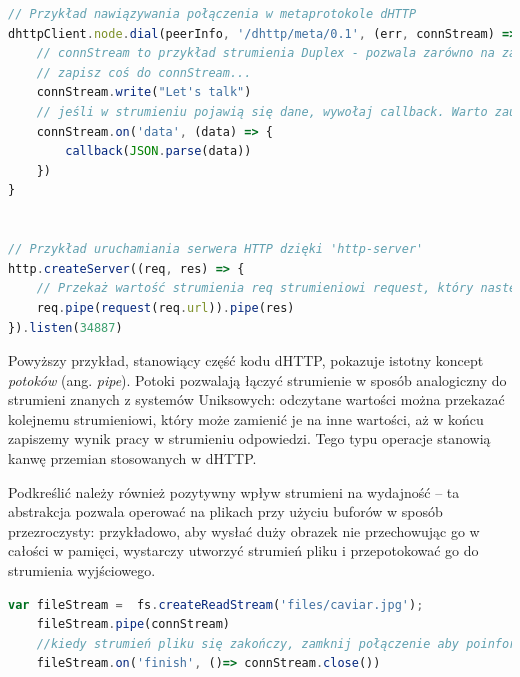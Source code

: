 \begin{lstlisting}[language=javascript]
// Przykład nawiązywania połączenia w metaprotokole dHTTP
dhttpClient.node.dial(peerInfo, '/dhttp/meta/0.1', (err, connStream) => {
    // connStream to przykład strumienia Duplex - pozwala zarówno na zapis, jak i odczyt.
    // zapisz coś do connStream...
    connStream.write("Let's talk")
    // jeśli w strumieniu pojawią się dane, wywołaj callback. Warto zauważyć, że to wywołanie może nastąpić zarówno przed, jak i po zawołaniu write -- zależy od stanu strumienia, który może otrzymywać dane w innych miejscach programu
    connStream.on('data', (data) => {
        callback(JSON.parse(data))
    })
}


// Przykład uruchamiania serwera HTTP dzięki 'http-server'
http.createServer((req, res) => {
    // Przekaż wartość strumienia req strumieniowi request, który następnie zostanie przekazany do res. W efekcie zadziałamy jako najprostsze proxy - otrzymamy dane o oryginalnym zapytaniu, wywołamy je z punktu widzenia serwera, i przekażemy wynik w ramach odpowiedzi.
    req.pipe(request(req.url)).pipe(res)
}).listen(34887)
\end{lstlisting}

Powyższy przykład, stanowiący część kodu dHTTP, pokazuje istotny koncept {\em potoków} (ang. {\em pipe}). Potoki pozwalają łączyć strumienie w sposób analogiczny do strumieni znanych z systemów Uniksowych: odczytane wartości można przekazać kolejnemu strumieniowi, który może zamienić je na inne wartości, aż w końcu zapiszemy wynik pracy w strumieniu odpowiedzi. Tego typu operacje stanowią kanwę przemian stosowanych w dHTTP.

Podkreślić należy również pozytywny wpływ strumieni na wydajność -- ta abstrakcja pozwala operować na plikach przy użyciu buforów w sposób przezroczysty: przykładowo, aby wysłać duży obrazek nie przechowując go w całości w pamięci, wystarczy utworzyć strumień pliku i przepotokować go do strumienia wyjściowego.

\begin{lstlisting}[language=javascript]
    var fileStream =  fs.createReadStream('files/caviar.jpg');
    fileStream.pipe(connStream)
    //kiedy strumień pliku się zakończy, zamknij połączenie aby poinformować odbiorcę, że nic już na niego nie czeka
    fileStream.on('finish', ()=> connStream.close())
\end{lstlisting}




